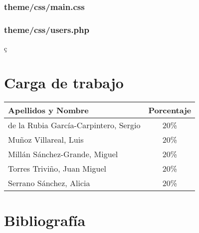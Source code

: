 \documentclass[12pt,a4paper,spanish,twoside]{article}
\begin{document}
\subsubsection{theme/css/main.css}


\subsubsection{theme/css/users.php}
ç

\section{Carga de trabajo}
\begin{center}
 \begin{tabular}{|p{10cm}|c|}\hline 
  Apellidos y Nombre & Porcentaje \\ \hline \hline
  de la Rubia García-Carpintero, Sergio & 20\% \\ \hline
  Muñoz Villareal, Luis & 20\% \\ \hline
  Millán Sánchez-Grande, Miguel & 20\% \\ \hline
  Torres Triviño, Juan Miguel & 20\% \\ \hline
  Serrano Sánchez, Alicia & 20\% \\ \hline 
 \end{tabular}
\end{center}

\section{Bibliografía}
\end{document}
